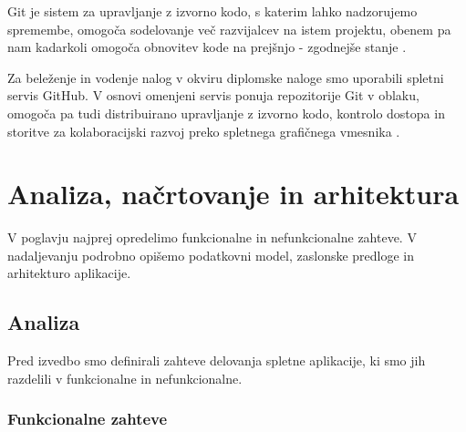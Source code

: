 \documentclass[a4paper, 12pt]{book}
\begin{document}
Git je sistem za upravljanje z izvorno kodo, s katerim lahko nadzorujemo spremembe, omogoča sodelovanje več razvijalcev na istem projektu, obenem pa nam kadarkoli omogoča obnovitev kode na prejšnjo - zgodnejše stanje \cite{sistem-git}.

Za beleženje in vodenje nalog v okviru diplomske naloge smo uporabili spletni servis GitHub. V osnovi omenjeni servis ponuja repozitorije Git v oblaku, omogoča pa tudi distribuirano upravljanje z izvorno kodo, kontrolo dostopa in storitve za kolaboracijski razvoj preko spletnega grafičnega vmesnika \cite{github}.



\chapter{Analiza, načrtovanje in arhitektura}
\label{analiza-nacrtovanje-arhitektura}

V poglavju najprej opredelimo funkcionalne in nefunkcionalne zahteve. V nadaljevanju podrobno opišemo podatkovni model, zaslonske predloge in arhitekturo aplikacije.


\section{Analiza}

Pred izvedbo smo definirali zahteve delovanja spletne aplikacije, ki smo jih razdelili v funkcionalne in nefunkcionalne.


\subsection{Funkcionalne zahteve}
\end{document}
